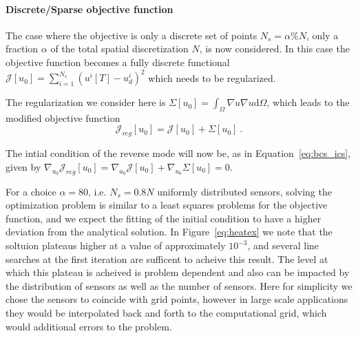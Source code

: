 \documentclass[10pt]{article}
\renewcommand{\d}{\mathrm{d}}
\begin{document}
\paragraph{Discrete/Sparse objective function}
The case where the objective is only a discrete set of points $N_s=\alpha\%N$, only a fraction $\alpha$ of the total spatial discretization $N$, is now considered. In this case the objective function becomes a fully discrete functional
$\mathcal J[u_0]=\sum_{i=1}^{N_s} (u^i[T]-u^i_d)^2 $ which needs to be regularized.

The regularization we consider here is 
$\Sigma[u_0]=\int_{\Omega} \nabla u \nabla u \d\Omega$, which leads to the modified objective function
$$\mathcal J_{reg}[u_0]= \mathcal J[u_0]+\Sigma[u_0] \ .$$

The intial condition of the reverse mode will now be, as in Equation~\ref{eq:bcs_ics}, given by $\nabla_{u_0} \mathcal J_{reg}[u_0] =\nabla_{u_0} \mathcal J[u_0]+\nabla_{u_0} \Sigma[u_0]=0 $.

For a choice $\alpha=80$, i.e. $N_s=0.8N$ uniformly distributed sensors, solving the optimization problem is similar to a least squares problems for the objective function, and we expect the fitting of the initial condition to have a higher deviation from the analytical solution. In Figure~\ref{eq:heatex} we note that the soltuion plateaus higher at a value of approximately $10^{-3}$, and several line searches at the first iteration are sufficent to acheive this result. The level at which this plateau is acheived is problem dependent and also can be impacted by the distribution of sensors as well as the number of sensors. Here for simplicity we chose the sensors to coincide with grid points, however in large scale applications they would be interpolated back and forth to the computational grid, which would additional errors to the problem.
\end{document}
